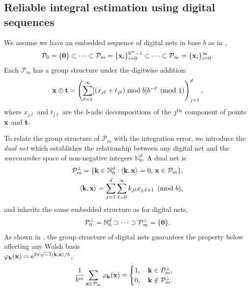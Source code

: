 \subsection{Reliable integral estimation using digital sequences}
\label{sec:3.1}

We assume we have an embedded sequence of digital nets in base $b$ as in \cite[Sec. 2-3]{HicJim},
\[
\mathcal{P}_0=\{\boldsymbol{\mathbf{0}}\}\subset\dots\subset\mathcal{P}_m=\{\boldsymbol{\mathbf{x}}_i\}_{i=0}^{b^m-1}\subset\dots\subset\mathcal{P}_\infty=\{\boldsymbol{\mathbf{x}}_i\}_{i=0}^{\infty}.
\]
Each $\mathcal{P}_m$ has a group structure under the digitwise addition:
\[
\boldsymbol{\mathbf{x}} \oplus \boldsymbol{\mathbf{t}} = \left(\sum_{\ell=1}^{\infty} [(x_{j\ell} + t_{j\ell}) \bmod b] b^{-\ell} \pmod{1} \right)_{j=1}^d,
\]
where $x_{j\ell}$ and $t_{j\ell}$ are the $b$-adic decompositions of the $j^{\rm th}$ component of points $\boldsymbol{\mathbf{x}}$ and $\boldsymbol{\mathbf{t}}$.

To relate the group structure of $\mathcal{P}_m$ with the integration error, we introduce the \emph{dual net} which establishes the relationship between any digital net and the \emph{wavenumber} space of non-negative integers $\mathbb{N}_0^d$. A dual net is
\begin{align*}
\mathcal{P}_m^\perp=\{\boldsymbol{\mathbf{k}}\in\mathbb{N}_0^d:\left \langle \boldsymbol{\mathbf{k}}, \boldsymbol{\mathbf{x}} \right \rangle_{{}}=0,\, \boldsymbol{\mathbf{x}}\in\mathcal{P}_m\}, \\
\left \langle \boldsymbol{\mathbf{k}}, \boldsymbol{\mathbf{x}} \right \rangle_{{}} = \sum_{j=1}^{d} \sum_{\ell=0}^{\infty} k_{j\ell}x_{j,\ell+1}  \pmod b,
\end{align*}
and inherits the same embedded structure as for digital nets,
\begin{equation}\label{dual_net_structure}
\mathcal{P}_0^\perp=\mathbb{N}_0^d\supset\dots\supset\mathcal{P}_\infty^\perp=\{\boldsymbol{\mathbf{0}}\}.
\end{equation}
As shown in \cite[Sec. 3]{HicJim}, the group structure of digital nets guarantees the property below affecting any Walsh basis \\$\varphi_{\boldsymbol{\mathbf{k}}}(\boldsymbol{\mathbf{x}})=\text{e}^{2 \pi \sqrt{-1} \left \langle \boldsymbol{\mathbf{k}}, \boldsymbol{\mathbf{x}} \right \rangle_{{}}/b}$,
\begin{equation}\label{basis_integ_prop}
\frac{1}{b^m}\sum_{\boldsymbol{\mathbf{x}}\in\mathcal{P}_m}\varphi_{\boldsymbol{\mathbf{k}}}(\boldsymbol{\mathbf{x}})=
\begin{cases}
1,\quad \boldsymbol{\mathbf{k}}\in\mathcal{P}_m^\perp, \\
0,\quad \boldsymbol{\mathbf{k}}\notin\mathcal{P}_m^\perp.
\end{cases}
\end{equation}

